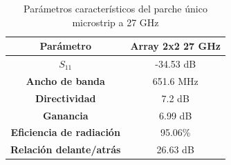 \begin{table}[H]
  
  
   \small %
   \centering %
   \begin{tabular}{c c} %
   \toprule[\heavyrulewidth]\toprule[\heavyrulewidth]
   \textbf{Parámetro} & \textbf{Array 2x2 27 GHz} \\ 
   \midrule
   \textbf{$S_{11}$} & -34.53 dB \\
   \textbf{Ancho de banda} & 651.6 MHz \\
   \textbf{Directividad} & 7.2 dB \\
   \textbf{Ganancia} & 6.99 dB \\
   \textbf{Eficiencia de radiación} & 95.06\% \\
   \textbf{Relación delante/atrás} & 26.63 dB \\

   \bottomrule[\heavyrulewidth] 
   \end{tabular}
   \caption{Parámetros característicos del parche único microstrip a 27 GHz} 
    \label{tab:res2x23}
\end{table}

